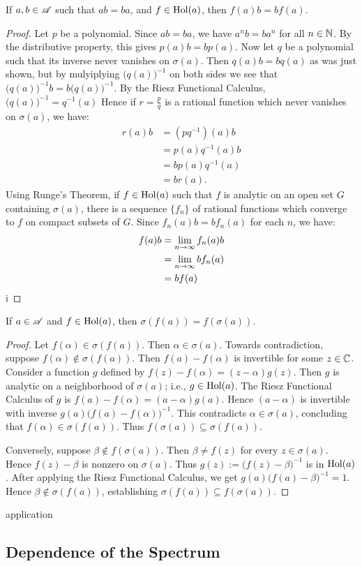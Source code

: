\begin{proposition}
	If $a,b \in \mathscr{A}$ such that $ab=ba$, and $f \in \operatorname{Hol}(a)$, then $f(a)b = bf(a)$.
\end{proposition}
	\begin{proof}
		Let $p$ be a polynomial. Since $ab=ba$, we have $a^nb = ba^n$ for all $n \in \mathbb{N}$. By the distributive property, this gives $p(a)b = bp(a)$. Now let $q$ be a polynomial such that its inverse never vanishes on $\sigma(a)$. Then $q(a)b = bq(a)$ as was just shown, but by mulyiplying $\bigl(q(a)\bigr)^{-1}$ on both sides we see that $\bigl( q(a) \bigr)^{-1} b = b \bigl( q(a) \bigr)^{-1}$. By the Riesz Functional Calculus, $\bigl( q(a) \bigr)^{-1} = q^{-1}(a)$ Hence if $r = \frac{p}{q}$ is a rational function which never vanishes on $\sigma(a)$, we have:
		\begin{align*}
			r(a)b
			&= (pq^{-1})(a) b \\
			&= p(a)q^{-1}(a) b\\
			&= bp(a)q^{-1}(a) \\
			&= br(a).
		\end{align*}
		Using Runge's Theorem, if $f \in \operatorname{Hol}(a)$ such that $f$ is analytic on an open set $G$ containing $\sigma(a)$, there is a sequence $\{f_n\}$ of rational functions which converge to $f$ on compact subsets of $G$. Since $f_n(a)b = bf_n(a)$ for each $n$, we have:
		\begin{align*}
			f(a)b
			&= \lim_{n \rightarrow \infty}f_n(a)b \\
			&= \lim_{n \rightarrow \infty}b f_n(a) \\
			&= bf(a) \qedhere
		\end{align*}i
	\end{proof}

\begin{theorem}
	If $a \in \mathscr{A}$ and $f \in \operatorname{Hol}(a)$, then $\sigma(f(a)) = f(\sigma(a))$.
\end{theorem}
	\begin{proof}
		Let $f(\alpha) \in \sigma(f(a))$. Then $\alpha \in \sigma(a)$. Towards contradiction, suppose $f(\alpha) \not\in \sigma(f(a))$. Then $f(a) - f(\alpha)$ is invertible for some $z \in \mathbb{C}$. Consider a function $g$ defined by $f(z) - f(\alpha) = (z-\alpha)g(z)$. Then $g$ is analytic on a neighborhood of $\sigma(a)$; i.e., $g \in \operatorname{Hol}(a)$. The Riesz Functional Calculus of $g$ is $f(a) - f(\alpha) = (a-\alpha)g(a)$. Hence $(a-\alpha)$ is invertible with inverse $g(a) \bigl( f(a) - f(\alpha) \bigr)^{-1}$. This contradicts $\alpha \in \sigma(a)$, concluding that $f(\alpha) \in \sigma(f(a))$. Thus $f(\sigma(a)) \subseteq \sigma(f(a))$. 

		Conversely, suppose $\beta \not\in f(\sigma(a))$. Then $\beta \neq f(z)$ for every $z \in \sigma(a)$. Hence $f(z) - \beta$ is nonzero on $\sigma(a)$. Thus $g(z) := \bigl( f(z) - \beta \bigr)^{-1}$ is in $\operatorname{Hol}(a)$. After applying the Riesz Functional Calculus, we get $g(a)\bigl( f(a) - \beta \bigr)^{-1} = 1$. Hence $\beta \not\in \sigma(f(a))$, establishing $\sigma(f(a)) \subseteq f(\sigma(a))$.
	\end{proof}

\begin{proposition}
	{\color{red} application}
\end{proposition}

\subsection{Dependence of the Spectrum}

